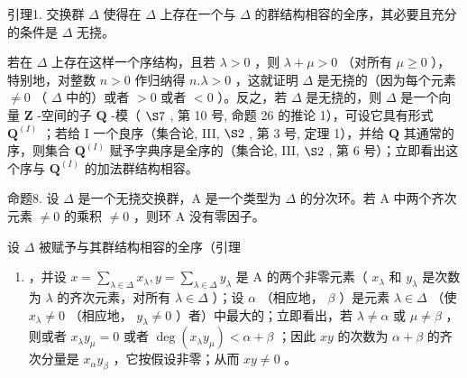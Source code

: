 引理1. 交换群 \(\Delta\) 使得在 \(\Delta\) 上存在一个与 \(\Delta\) 的群结构相容的全序，其必要且充分的条件是 \(\Delta\) 无挠。

若在 \(\Delta\) 上存在这样一个序结构，且若 \(\lambda > 0\) ，则 \(\lambda + \mu > 0\) （对所有 \(\mu \geqslant 0\) ），特别地，对整数 \(n > 0\) 作归纳得 \(n.\lambda > 0\) ，这就证明 \(\Delta\) 是无挠的（因为每个元素 \(\neq 0\) （ \(\Delta\) 中的）或者 \(>0\) 或者 \(< 0\) ）。反之，若 \(\Delta\) 是无挠的，则 \(\Delta\) 是一个向量 \(\mathbf{Z}\) -空间的子 \(\mathbf{Q}\) -模（ \(\S 7\) , 第 10 号, 命题 26 的推论 1），可设它具有形式 \(\mathbf{Q}^{(I)}\) ；若给 I 一个良序（集合论, III, \(\S 2\) , 第 3 号, 定理 1），并给 \(\mathbf{Q}\) 其通常的序，则集合 \(\mathbf{Q}^{(I)}\) 赋予字典序是全序的（集合论, III, \(\S 2\) , 第 6 号）；立即看出这个序与 \(\mathbf{Q}^{(I)}\) 的加法群结构相容。

命题8. 设 \(\Delta\) 是一个无挠交换群，A 是一个类型为 \(\Delta\) 的分次环。若 A 中两个齐次元素 \(\neq 0\) 的乘积 \(\neq 0\) ，则环 A 没有零因子。

设 \(\Delta\) 被赋予与其群结构相容的全序（引理

\begin{enumerate}
\def\labelenumi{\arabic{enumi})}
\tightlist
\item
  ，并设 \(x = \sum_{\lambda \in \Delta} x_{\lambda}, y = \sum_{\lambda \in \Delta} y_{\lambda}\) 是 A 的两个非零元素（ \(x_{\lambda}\) 和 \(y_{\lambda}\) 是次数为 \(\lambda\) 的齐次元素，对所有 \(\lambda \in \Delta\) ）；设 \(\alpha\) （相应地， \(\beta\) ）是元素 \(\lambda \in \Delta\) （使 \(x_{\lambda} \neq 0\) （相应地， \(y_{\lambda} \neq 0\) ）者）中最大的；立即看出，若 \(\lambda \neq \alpha\) 或 \(\mu \neq \beta\) ，则或者 \(x_{\lambda}y_{\mu} = 0\) 或者 \(\deg(x_{\lambda}y_{\mu}) < \alpha + \beta\) ；因此 \(xy\) 的次数为 \(\alpha + \beta\) 的齐次分量是 \(x_{\alpha}y_{\beta}\) ，它按假设非零；从而 \(xy \neq 0\) 。
\end{enumerate}

